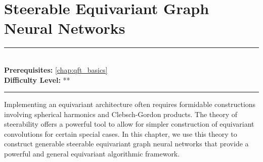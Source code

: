 \documentclass[book.tex]{subfiles}
\begin{document}
\chapter{Steerable Equivariant Graph Neural Networks}

\label{chap:steerable}
\noindent\rule{11cm}{0.4pt} \\
\textbf{Prerequisites:} \autoref{chap:qft_basics}  \\
\textbf{Difficulty Level:} ** \\
\noindent\rule{11cm}{0.4pt}
\vspace{5mm}


Implementing an equivariant architecture often requires formidable constructions involving spherical harmonics and Clebsch-Gordon products. The theory of steerability \cite{cohen2016steerable} offers a powerful tool to allow for simpler construction of equivariant convolutions for certain special cases. In this chapter, we use this theory to construct generable steerable equivariant graph neural networks that provide a powerful and general equivariant algorithmic framework.

\end{document}
